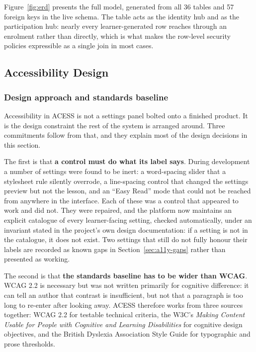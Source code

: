 \documentclass[12pt, oneside]{article} %
\newcommand{\tcode}[1]{\path{#1}}
\begin{document}
Figure~\ref{fig:erd} presents the full model, generated from all 36 tables and 57 foreign keys in the live schema. The \tcode{users} table acts as the identity hub and \tcode{enrollments} as the participation hub: nearly every learner-generated row reaches \tcode{users} through an enrolment rather than directly, which is what makes the row-level security policies expressible as a single join in most cases.

\subsection{Accessibility Design}
\label{sec:a11y-design}

\subsubsection{Design approach and standards baseline}

Accessibility in ACESS is not a settings panel bolted onto a finished product. It is the design constraint the rest of the system is arranged around. Three commitments follow from that, and they explain most of the design decisions in this section.

The first is that \textbf{a control must do what its label says}. During development a number of settings were found to be inert: a word-spacing slider that a stylesheet rule silently overrode, a line-spacing control that changed the settings preview but not the lesson, and an ``Easy Read'' mode that could not be reached from anywhere in the interface. Each of these was a control that appeared to work and did not. They were repaired, and the platform now maintains an explicit catalogue of every learner-facing setting, checked automatically, under an invariant stated in the project's own design documentation: if a setting is not in the catalogue, it does not exist. Two settings that still do not fully honour their labels are recorded as known gaps in Section~\ref{sec:a11y-gaps} rather than presented as working.

The second is that \textbf{the standards baseline has to be wider than WCAG}. WCAG 2.2 is necessary but was not written primarily for cognitive difference: it can tell an author that contrast is insufficient, but not that a paragraph is too long to re-enter after looking away. ACESS therefore works from three sources together: WCAG 2.2 \cite{wcag22} for testable technical criteria, the W3C's \emph{Making Content Usable for People with Cognitive and Learning Disabilities} \cite{wcag_cognitive} for cognitive design objectives, and the British Dyslexia Association Style Guide \cite{bda_style_guide} for typographic and prose thresholds.
\end{document}

